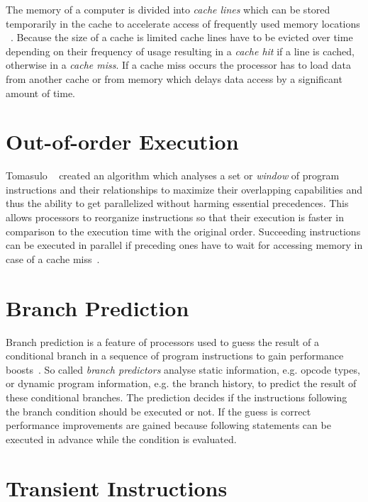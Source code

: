 \documentclass[a4paper,oneside,openright] {scrreprt}
\begin{document}
The memory of a computer is divided into \textit{cache lines} which can be stored temporarily in the cache to accelerate
access of frequently used memory locations ~\cite{tanenbaum2009modern:24-27}. Because the size of a cache is limited
cache lines have to be evicted over time depending on their frequency of usage resulting in a \textit{cache hit} if a line
is cached, otherwise in a \textit{cache miss}. If a cache miss occurs the processor has to load data from another
cache or from memory which delays data access by a significant amount of time.

\section{Out-of-order Execution}
\label{ch:intro:motivation}

Tomasulo ~\cite{tomasulo1967efficient} created an algorithm which analyses a set or \textit{window} of
program instructions and their relationships to maximize their overlapping capabilities and thus the ability to get parallelized 
without harming essential precedences. This allows processors to reorganize instructions so that their execution is faster 
in comparison to the execution time with the original order.
Succeeding instructions can be executed in parallel if preceding ones
 have to wait for accessing memory in case of a cache miss~\cite{hennessy2011computer:183}.

\section{Branch Prediction}
\label{ch:intro:branch_prediction}

Branch prediction is a feature of processors used to guess the result of a conditional branch in a sequence of program instructions to gain performance boosts~\cite{smith1995microarchitecture}.
So called \textit{branch predictors} analyse static information, e.g. opcode types, or dynamic program information, e.g. the branch history, to predict the result of these conditional branches.
The prediction decides if the instructions following the branch condition should be executed or not.
If the guess is correct performance improvements are gained because following statements can be executed in advance 
while the condition is evaluated.

\section{Transient Instructions}
\label{ch:intro:branch_prediction}
\end{document}
